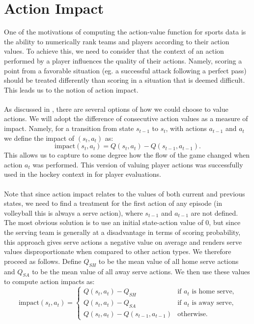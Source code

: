 \documentclass{sfuthesis}
\begin{document}
	\section{Action Impact}
	
	One of the motivations of computing the action-value function for sports data is the ability to numerically rank teams and players according to their action values. To achieve this, we need to consider that the context of an action performed by a player influences the quality of their actions. Namely, scoring a point from a favorable situation (eg. a successful attack following a perfect pass) should be treated differently than scoring in a situation that is deemed difficult. This leads us to the notion of action impact.\\\\
	As discussed in \cite{routley2015markov}, there are several options of how we could choose to value actions. We will adopt the difference of consecutive action values as a measure of impact. Namely, for a transition from state $s_{t-1}$ to $s_t$, with actions $a_{t-1}$ and $a_t$ we define the impact of $(s_t, a_t)$ as:
	\begin{equation}
		\text{impact}(s_t,a_t) = Q(s_t,a_t) - Q(s_{t-1},a_{t-1}).
		\label{eq:action_impact}
	\end{equation}
	This allows us to capture to some degree how the flow of the game changed when action $a_t$ was performed. This version of valuing player actions was successfully used in the hockey context in \cite{liu2018deep} for player evaluations.\\\\
	Note that since action impact relates to the values of both current and previous states, we need to find a treatment for the first action of any episode (in volleyball this is always a serve action), where $s_{t-1}$ and $a_{t-1}$ are not defined. The most obvious solution is to use an initial state-action value of 0, but since the serving team is generally at a disadvantage in terms of scoring probability, this approach gives serve actions a negative value on average and renders serve values disproportionate when compared to other action types. We therefore proceed as follows. Define $Q_{SH}$ to be the mean value of all home serve actions and $Q_{SA}$ to be the mean value of all away serve actions. We then use these values to compute action impacts as:
	\begin{equation}
		\text{impact}(s_t,a_t) =
		\begin{cases} 
			Q(s_t,a_t) - Q_{SH} & \text{if } a_t \text{ is home serve,} \\
			Q(s_t,a_t) - Q_{SA} & \text{if } a_t \text{ is away serve,} \\
			Q(s_t,a_t) - Q(s_{t-1},a_{t-1}) & \text{otherwise.} 
		\end{cases}
		\label{eq:action_impact2}
	\end{equation}
\end{document}
